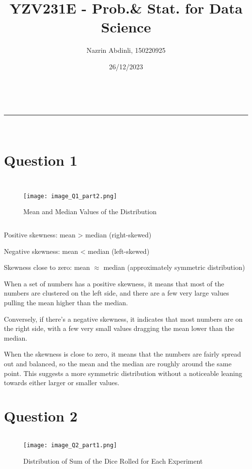 \documentclass[a4paper,11pt]{article}
\makeatletter
\newcommand{\linia}{\rule{\linewidth}{0.5pt}}
\theoremstyle{mytheor}
\renewcommand{\maketitle}{
\begin{center}
\vspace{2ex}
{\huge \textsc{\@title}}
\vspace{1ex}
\\
\linia\\
\@author \hfill \@date
\vspace{4ex}
\end{center}
}
\makeatother
\begin{document}
\title{YZV231E - Prob.& Stat. for Data Science}

\author{Nazrin Abdinli, 150220925}

\date{26/12/2023}

\maketitle

\section*{Question 1}

\inputminted[breaklines]{python}{script_Q1_part1.py}

\newpage

\inputminted[breaklines]{python}{script_Q1_part2.py}
\begin{figure} [H]
    \centering
    \texttt{[image: image\_Q1\_part2.png]}
    \caption{Mean and Median Values of the Distribution}
    \label{fig:enter-label}
\end{figure}


\inputminted[breaklines]{python}{script_Q1_part3.py}
Positive skewness: mean > median (right-skewed)

Negative skewness: mean < median (left-skewed)

Skewness close to zero: mean $\approx$ median (approximately symmetric distribution)

When a set of numbers has a positive skewness, it means that most of the numbers are clustered on the left side, 
and there are a few very large values pulling the mean higher than the median.

Conversely, if there's a negative skewness, it indicates that most numbers are on the right side,
with a few very small values dragging the mean lower than the median.

When the skewness is close to zero, it means that the numbers are fairly spread out and balanced,
so the mean and the median are roughly around the same point. 
This suggests a more symmetric distribution without a noticeable leaning towards either larger or smaller values.

\newpage

\section*{Question 2}

\inputminted[breaklines]{python}{script_Q2_part1.py}
\begin{figure} [H]
    \centering
    \texttt{[image: image\_Q2\_part1.png]}
    \caption{Distribution of Sum of the Dice Rolled for Each Experiment}
    \label{fig:enter-label}
\end{figure}
\end{document}
